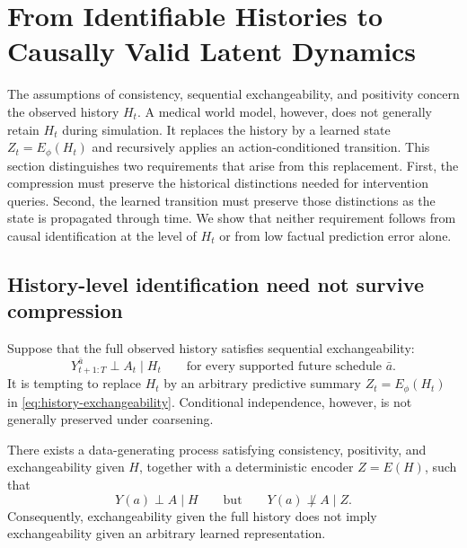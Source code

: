 
\section{From Identifiable Histories to Causally Valid Latent Dynamics}
\label{sec:theory}

The assumptions of consistency, sequential exchangeability, and
positivity concern the observed history $H_t$. A medical world model,
however, does not generally retain $H_t$ during simulation. It replaces
the history by a learned state $Z_t=E_\phi(H_t)$ and recursively applies
an action-conditioned transition. This section distinguishes two
requirements that arise from this replacement. First, the compression
must preserve the historical distinctions needed for intervention
queries. Second, the learned transition must preserve those distinctions
as the state is propagated through time. We show that neither requirement
follows from causal identification at the level of $H_t$ or from low
factual prediction error alone.

\subsection{History-level identification need not survive compression}
\label{sec:compression-exchangeability}

Suppose that the full observed history satisfies sequential
exchangeability:
\begin{equation}
    Y_{t+1:T}^{\bar a}\perp A_t\mid H_t
    \qquad\text{for every supported future schedule }\bar a.
    \label{eq:history-exchangeability}
\end{equation}
It is tempting to replace $H_t$ by an arbitrary predictive summary
$Z_t=E_\phi(H_t)$ in \eqref{eq:history-exchangeability}. Conditional
independence, however, is not generally preserved under coarsening.

\begin{theorem}
\label{thm:compression-breaks-exchangeability}
There exists a data-generating process satisfying consistency,
positivity, and exchangeability given $H$, together with a deterministic
encoder $Z=E(H)$, such that
\begin{equation}
    Y(a)\perp A\mid H
    \qquad\text{but}\qquad
    Y(a)\not\perp A\mid Z.
    \label{eq:exchangeability-not-preserved}
\end{equation}
Consequently, exchangeability given the full history does not imply
exchangeability given an arbitrary learned representation.
\end{theorem}

